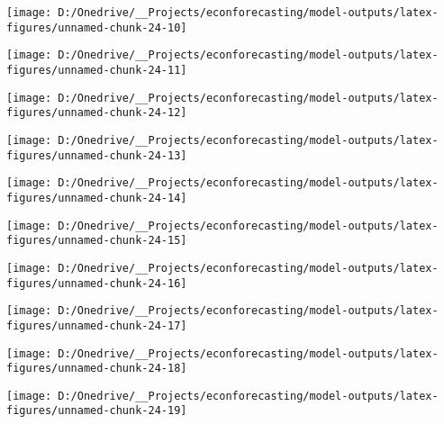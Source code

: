 \documentclass[11pt, letterpaper]{article}\usepackage[]{graphicx}\usepackage[]{color}
\begin{document}
{\centering \texttt{[image: D:/Onedrive/\_\_Projects/econforecasting/model-outputs/latex-figures/unnamed-chunk-24-10]} 

}




{\centering \texttt{[image: D:/Onedrive/\_\_Projects/econforecasting/model-outputs/latex-figures/unnamed-chunk-24-11]} 

}




{\centering \texttt{[image: D:/Onedrive/\_\_Projects/econforecasting/model-outputs/latex-figures/unnamed-chunk-24-12]} 

}




{\centering \texttt{[image: D:/Onedrive/\_\_Projects/econforecasting/model-outputs/latex-figures/unnamed-chunk-24-13]} 

}




{\centering \texttt{[image: D:/Onedrive/\_\_Projects/econforecasting/model-outputs/latex-figures/unnamed-chunk-24-14]} 

}




{\centering \texttt{[image: D:/Onedrive/\_\_Projects/econforecasting/model-outputs/latex-figures/unnamed-chunk-24-15]} 

}




{\centering \texttt{[image: D:/Onedrive/\_\_Projects/econforecasting/model-outputs/latex-figures/unnamed-chunk-24-16]} 

}




{\centering \texttt{[image: D:/Onedrive/\_\_Projects/econforecasting/model-outputs/latex-figures/unnamed-chunk-24-17]} 

}




{\centering \texttt{[image: D:/Onedrive/\_\_Projects/econforecasting/model-outputs/latex-figures/unnamed-chunk-24-18]} 

}




{\centering \texttt{[image: D:/Onedrive/\_\_Projects/econforecasting/model-outputs/latex-figures/unnamed-chunk-24-19]} 

}
\end{document}
